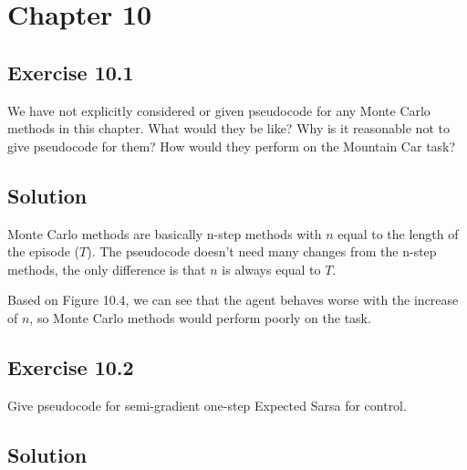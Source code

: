 \section*{Chapter 10}

\subsection*{Exercise 10.1}

We have not explicitly considered or given pseudocode for any Monte Carlo
methods in this chapter. What would they be like? Why is it reasonable not to give
pseudocode for them? How would they perform on the Mountain Car task?
\subsection*{Solution}

Monte Carlo methods are basically n-step methods with $n$ equal to the length of the episode  ($T$).
The pseudocode doesn't need many changes from the n-step methods, the only difference is that $n$ is always equal to $T$.

Based on Figure 10.4, we can see that the agent behaves worse with the increase of $n$, so Monte Carlo methods would perform poorly on the task.

\subsection*{Exercise 10.2}

Give pseudocode for semi-gradient one-step Expected Sarsa for control.

\subsection*{Solution}

